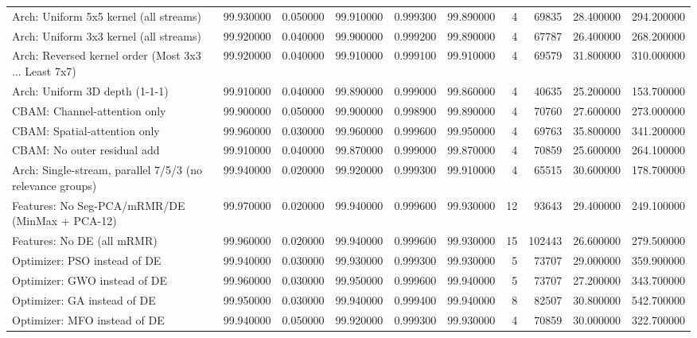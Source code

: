 \begin{tabular}{lrrrrrrrrr}
Arch: Uniform 5x5 kernel (all streams) & 99.930000 & 0.050000 & 99.910000 & 0.999300 & 99.890000 & 4 & 69835 & 28.400000 & 294.200000 \\
Arch: Uniform 3x3 kernel (all streams) & 99.920000 & 0.040000 & 99.900000 & 0.999200 & 99.890000 & 4 & 67787 & 26.400000 & 268.200000 \\
Arch: Reversed kernel order (Most 3x3 ... Least 7x7) & 99.920000 & 0.040000 & 99.910000 & 0.999100 & 99.910000 & 4 & 69579 & 31.800000 & 310.000000 \\
Arch: Uniform 3D depth (1-1-1) & 99.910000 & 0.040000 & 99.890000 & 0.999000 & 99.860000 & 4 & 40635 & 25.200000 & 153.700000 \\
CBAM: Channel-attention only & 99.900000 & 0.050000 & 99.900000 & 0.998900 & 99.890000 & 4 & 70760 & 27.600000 & 273.000000 \\
CBAM: Spatial-attention only & 99.960000 & 0.030000 & 99.960000 & 0.999600 & 99.950000 & 4 & 69763 & 35.800000 & 341.200000 \\
CBAM: No outer residual add & 99.910000 & 0.040000 & 99.870000 & 0.999000 & 99.870000 & 4 & 70859 & 25.600000 & 264.100000 \\
Arch: Single-stream, parallel 7/5/3 (no relevance groups) & 99.940000 & 0.020000 & 99.920000 & 0.999300 & 99.910000 & 4 & 65515 & 30.600000 & 178.700000 \\
Features: No Seg-PCA/mRMR/DE (MinMax + PCA-12)  & 99.970000 & 0.020000 & 99.940000 & 0.999600 & 99.930000 & 12 & 93643 & 29.400000 & 249.100000 \\
Features: No DE (all mRMR) & 99.960000 & 0.020000 & 99.940000 & 0.999600 & 99.930000 & 15 & 102443 & 26.600000 & 279.500000 \\
Optimizer: PSO instead of DE & 99.940000 & 0.030000 & 99.930000 & 0.999300 & 99.930000 & 5 & 73707 & 29.000000 & 359.900000 \\
Optimizer: GWO instead of DE & 99.960000 & 0.030000 & 99.950000 & 0.999600 & 99.940000 & 5 & 73707 & 27.200000 & 343.700000 \\
Optimizer: GA instead of DE & 99.950000 & 0.030000 & 99.940000 & 0.999400 & 99.940000 & 8 & 82507 & 30.800000 & 542.700000 \\
Optimizer: MFO instead of DE & 99.940000 & 0.050000 & 99.920000 & 0.999300 & 99.930000 & 4 & 70859 & 30.000000 & 322.700000 \\
\bottomrule
\end{tabular}
